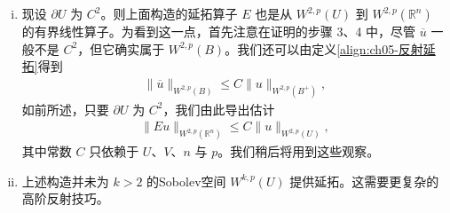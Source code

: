 \documentclass[../../main.tex]{subfiles}%
\begin{document}
\begin{remark}\label{remark:ch05-延拓注}
\begin{enumerate}[(i)]
\item 现设 $\partial U$ 为 $C^{2}$。则上面构造的延拓算子 $E$ 也是从 $W^{2,p}(U)$ 到 $W^{2,p}(\mathbb{R}^{n})$ 的有界线性算子。为看到这一点，首先注意在证明的步骤 3、4 中，尽管 $\overline{u}$ 一般不是 $C^{2}$，但它确实属于 $W^{2,p}(B)$。我们还可以由定义\eqref{align:ch05-反射延拓}得到
\begin{align*}
\|\overline{u}\|_{W^{2,p}(B)}\leqslant C\|u\|_{W^{2,p}(B^{+})},
\end{align*}
如前所述，只要 $\partial U$ 为 $C^{2}$，我们由此导出估计
\begin{align}
\|Eu\|_{W^{2,p}(\mathbb{R}^{n})}\leqslant C\|u\|_{W^{2,p}(U)},
\end{align}
其中常数 $C$ 只依赖于 $U$、$V$、$n$ 与 $p$。我们稍后将用到这些观察。
\item 上述构造并未为 $k>2$ 的Sobolev空间 $W^{k,p}(U)$ 提供延拓。这需要更复杂的高阶反射技巧。
\end{enumerate}
\end{remark}
\end{document}
